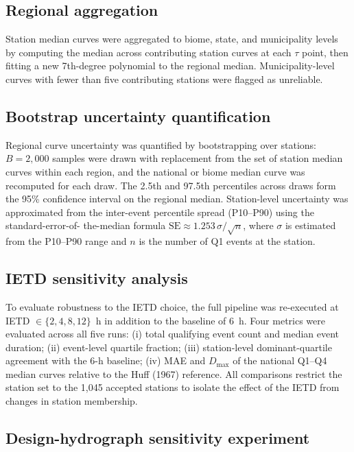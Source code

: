 \documentclass[a4paper,fleqn]{cas-sc}
\begin{document}
\subsection{Regional aggregation}

Station median curves were aggregated to biome, state, and
municipality levels by computing the median across contributing
station curves at each $\tau$ point, then fitting a new 7th-degree
polynomial to the regional median. Municipality-level curves with
fewer than five contributing stations were flagged as unreliable.

\subsection{Bootstrap uncertainty quantification}
\label{sec:bootstrap}

Regional curve uncertainty was quantified by bootstrapping over
stations: $B = 2{,}000$ samples were drawn with replacement from the
set of station median curves within each region, and the national or
biome median curve was recomputed for each draw. The 2.5th and 97.5th
percentiles across draws form the 95\% confidence interval on the
regional median. Station-level uncertainty was approximated from the
inter-event percentile spread (P10–P90) using the standard-error-of-
the-median formula $\mathrm{SE} \approx 1.253\,\sigma/\sqrt{n}$,
where $\sigma$ is estimated from the P10–P90 range and $n$ is the
number of Q1 events at the station.

\subsection{IETD sensitivity analysis}
\label{sec:ietd_method}

To evaluate robustness to the IETD choice, the full pipeline was
re-executed at IETD $\in \{2, 4, 8, 12\}$~h in addition to the
baseline of 6~h. Four metrics were evaluated across all five runs:
(i) total qualifying event count and median event duration;
(ii) event-level quartile fraction;
(iii) station-level dominant-quartile agreement with the 6-h baseline;
(iv) MAE and $D_\mathrm{max}$ of the national Q1–Q4 median curves
relative to the Huff (1967) reference. All comparisons restrict the
station set to the 1,045 accepted stations to isolate the effect of
the IETD from changes in station membership.

\subsection{Design-hydrograph sensitivity experiment}
\label{sec:hydro_method}
\end{document}
